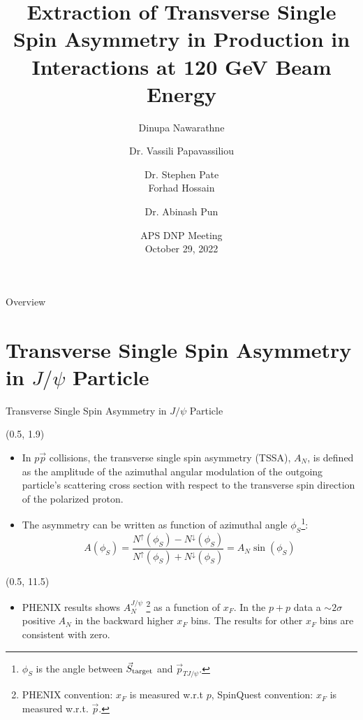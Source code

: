 \documentclass[10pt, xcolor={dvipsnames}, aspectratio = 169]{beamer}
\title{Extraction of Transverse Single Spin Asymmetry in \jpsi Production in \pp Interactions at 120 GeV Beam Energy}
\author{Dinupa Nawarathne  \and Dr. Vassili Papavassiliou \and Dr. Stephen Pate \\ Forhad Hossain \and Dr. Abinash Pun}
\institute{New Mexico State University \\
Representing the E-1039/SpinQuest
Collaboration}
\date{APS DNP Meeting
\\ October 29, 2022 }
\newcommand{\citeme}[1]{{\tiny \footfullcite{#1}}}
\newcommand{\jpsi}{$J/\psi$ }
\newcommand{\pp}{$p\vec{p}$ }
\begin{document}
%
%
\begin{frame}
\maketitle
\end{frame}

%
%
\begin{frame}{Overview}
\tableofcontents
\end{frame}

%
%
\section{Transverse Single Spin Asymmetry in \jpsi Particle}

\begin{frame}{Transverse Single Spin Asymmetry in \jpsi Particle}

\begin{textblock}{8.0}(0.5, 1.9)

\begin{itemize}

\item In \pp collisions, the transverse single spin asymmetry (TSSA), $A_{N}$, is defined as the amplitude of the
azimuthal angular modulation of the outgoing particle’s scattering cross section with respect to the transverse spin
direction of the polarized proton.

\item The asymmetry can be written as function of azimuthal angle $\phi_{S}$\footnote{\tiny {$\phi_{S}$ is the angle
between $\vec{S}_{\rm target}$ and $\vec{p}_{TJ/\psi}$}.}:
%
\begin{equation*}
    A(\phi_{S}) = \frac{N^{\uparrow}(\phi_{S}) - N^{\downarrow}(\phi_{S})}{N^{\uparrow}(\phi_{S}) + N^{\downarrow}(\phi_{S})} = A_{N}\sin(\phi_{S})
\end{equation*}
%
%
\end{itemize}
\end{textblock}

\begin{textblock}{15.0}(0.5, 11.5)
\begin{itemize}
\item PHENIX results\citeme{PHENIX:2018qvl} shows $A_{N}^{J/\psi}$ \footnote{\tiny{PHENIX convention: $x_{F}$ is measured w.r.t $p$, SpinQuest convention: $x_{F}$ is measured w.r.t. $\vec{p}$.}} as a function of $x_{F}$. In the $p+p$ data a $\sim 2\sigma$ positive $A_{N}$ in the backward higher $x_{F}$ bins. The results for other $x_{F}$ bins are consistent with zero.
\end{itemize}
\end{textblock}


\end{frame}
\end{document}
